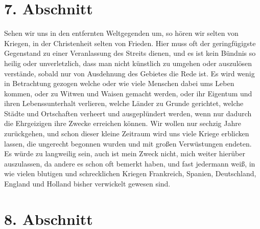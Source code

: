\section{7. Abschnitt} \label{kap8_ab7}

Sehen wir uns in den entfernten Weltgegenden um, so hören wir selten von
Kriegen, in der Christenheit selten von Frieden. Hier muss oft der geringfügigste
Gegenstand zu einer Veranlassung des Streits dienen, und es ist kein Bündnis so
heilig oder unverletzlich, dass man nicht künstlich zu umgehen oder auszulösen
verstände, sobald nur von Ausdehnung des Gebietes die Rede ist. Es wird wenig in
Betrachtung gezogen welche oder wie viele Menschen dabei ums Leben kommen, oder
zu Witwen und Waisen gemacht werden, oder ihr Eigentum und ihren
Lebenssunterhalt verlieren, welche Länder zu Grunde gerichtet, welche Städte und
Ortschaften verheert und ausgeplündert werden, wenn nur dadurch die Ehrgeizigen
ihre Zwecke erreichen können. Wir wollen nur sechzig Jahre zurückgehen, und
schon dieser kleine Zeitraum wird uns viele Kriege erblicken lassen, die
ungerecht begonnen wurden und mit großen Verwüstungen endeten. Es würde zu
langweilig sein, auch ist mein Zweck nicht, mich weiter hierüber auszulassen, da
andere es schon oft bemerkt haben, und fast jedermann weiß, in wie vielen
blutigen und schrecklichen Kriegen Frankreich, Spanien, Deutschland, England und
Holland bisher verwickelt gewesen sind.

\section{8. Abschnitt} \label{kap8_ab8}

